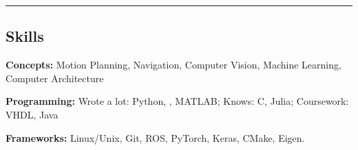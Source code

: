 \cvcond{\vspace{-0.5em}}
\hrule
\vspace{-1em}
\subsection*{Skills}
\cvcond{\vspace{-0.5em}}

\begin{indentsection}{\parindent}
    \setlength\itemsep{2em}
    \begin{description*}
        \item \textbf{Concepts:} Motion Planning, Navigation, Computer Vision, Machine Learning, Computer Architecture
        \item \textbf{Programming:} {Wrote a lot}: Python, \textbf{\CPP}, MATLAB; {Knows}: C, Julia; {Coursework}: VHDL, Java
        \item \textbf{Frameworks:} Linux/Unix, Git, ROS, PyTorch, Keras, CMake, Eigen.
    \end{description*}
\end{indentsection}
